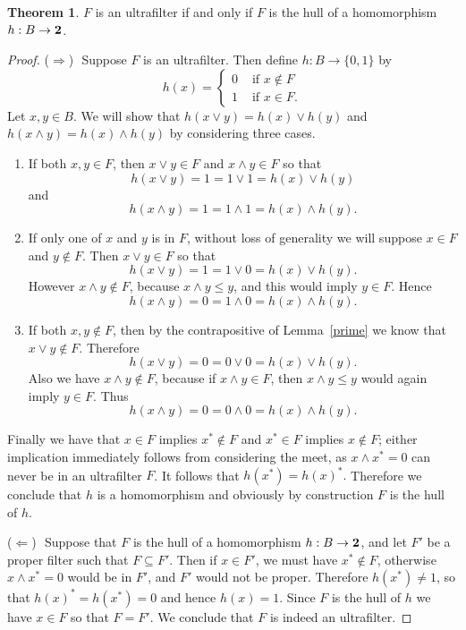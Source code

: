 \documentclass[11pt,titlepage]{article}
\newcommand{\forward}{\noindent ($\Longrightarrow$) \,\,}
\newcommand{\back}{\noindent ($\Longleftarrow$) \,\,}
\theoremstyle{definition}
\newtheorem{theorem}[definition]{Theorem}
\begin{document}
\begin{theorem}\label{ult.homo} $F$ is an ultrafilter if and only if $F$ is the hull of a homomorphism $h:B\to {\bf 2}$.\end{theorem}

\begin{proof} \forward Suppose $F$ is an ultrafilter. Then define $h:B\to \{0,1\}$ by $$h(x)=\begin{cases} 0 & \text{ if }x\notin F\\ 
			1 & \text{ if } x\in F.
\end{cases}$$ Let $x,y\in B$.  We will show that $h(x\lor y) = h(x)\lor h(y)$ and $h(x\land y)=h(x)\land h(y)$ by considering three cases.\begin{enumerate}
\item If both $x,y\in F$, then $x\lor y\in F$ and $x\land y\in F$ so that $$h(x\lor y)= 1 = 1 \lor 1 = h(x) \lor h(y)$$ and $$h(x\land y)= 1 = 1\land 1 = h(x)\land h(y).$$

\item If only one of $x$ and $y$ is in $F$, without loss of generality we will suppose $x\in F$ and $y\notin F$. Then $x\lor y \in F$ so that $$h(x\lor y) = 1 = 1 \lor 0 = h(x) \lor h(y).$$ However $x\land y \notin F$, because $x\land y \leq y$, and this would imply $y\in F$. Hence $$h(x\land y) =0 = 1\land 0 = h(x)\land h(y).$$

\item If both $x,y \notin F$, then by the contrapositive of Lemma~\ref{prime} we know that $x\lor y\notin F$. Therefore $$h(x\lor y)= 0 = 0\lor 0 = h(x)\lor h(y).$$ Also we have $x\land y\notin F$, because if $x\land y\in F$, then $x\land y \leq y$ would again imply $y\in F$. Thus $$h(x\land y)=0= 0\land 0 = h(x)\land h(y).$$ 
\end{enumerate}
Finally we have that $x\in F$ implies $x^*\notin F$ and $x^*\in F$ implies $x\notin F$; either implication immediately follows from considering the meet, as $x\land x^*=0$ can never be in an ultrafilter $F$. It follows that $h(x^*)=h(x)^*.$ Therefore we conclude that $h$ is a homomorphism and obviously by construction $F$ is the hull of $h$.
 

\back Suppose that $F$ is the hull of a homomorphism $h:B\to {\bf 2}$, and let $F'$ be a proper filter such that $F\subseteq F'$. Then if $x\in F'$, we must have $x^*\notin F$, otherwise $x\land x^* =0$ would be in $F'$, and $F'$ would not be proper. Therefore $h(x^*)\ne 1$, so that $h(x)^*=h(x^*)=0$ and hence $h(x)=1$. Since $F$ is the hull of $h$ we have $x\in F$ so that $F=F'$. We conclude that $F$ is indeed an ultrafilter. \end{proof}
\end{document}
